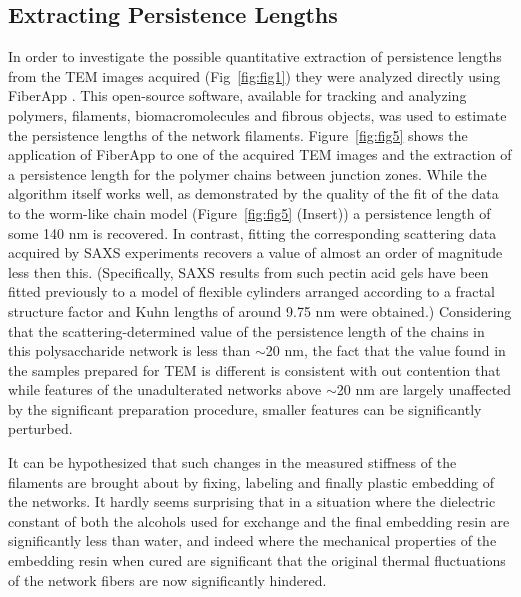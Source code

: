 \subsection{Extracting Persistence Lengths}
In order to investigate the possible quantitative extraction of persistence lengths from the TEM images acquired (Fig~\ref{fig:fig1}) they were analyzed directly using FiberApp \cite{usov2015}. This open-source software, available for tracking and analyzing polymers, filaments, biomacromolecules and fibrous objects, was used to estimate the persistence lengths of the network filaments. Figure~\ref{fig:fig5} shows the application of FiberApp to one of the acquired TEM images and the extraction of a persistence length for the polymer chains between junction zones. While the algorithm itself works well, as demonstrated by the quality of the fit of the data to the worm-like chain model (Figure~\ref{fig:fig5} (Insert)) a persistence length of some 140 nm is recovered. In contrast, fitting the corresponding scattering data acquired by SAXS experiments recovers a value of almost an order of magnitude less then this. (Specifically, SAXS results from such pectin acid gels have been fitted previously to a model of flexible cylinders arranged according to a fractal structure factor \cite{mansel_zooming_2015} and Kuhn lengths of around 9.75 nm were obtained.) Considering that the scattering-determined value of the persistence length of the chains in this polysaccharide network is less than $\sim$20 nm, the fact that the value found in the samples prepared for TEM is different is consistent with out contention that while features of the unadulterated networks above $\sim$20 nm are largely unaffected by the significant preparation procedure, smaller features can be significantly perturbed.


It can be hypothesized that such changes in the measured stiffness of the filaments are brought about by fixing, labeling and finally plastic embedding of the networks. It hardly seems surprising that in a situation where the dielectric constant of both the alcohols used for exchange and the final embedding resin are significantly less than water, and indeed where the mechanical properties of the embedding resin when cured are significant that the original thermal fluctuations of the network fibers are now significantly hindered. 

